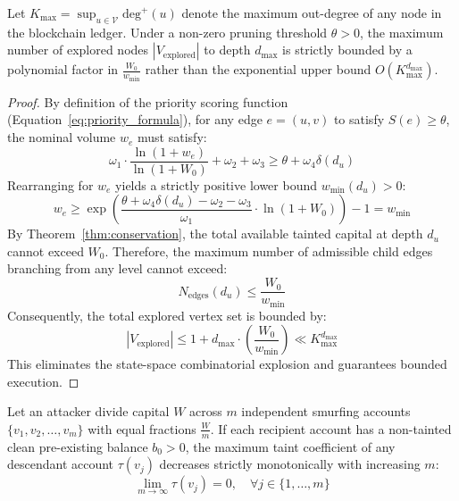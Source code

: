 \begin{theorem}
\label{thm:bounded_traversal}
Let $K_{\max} = \sup_{u \in \mathcal{V}} \text{deg}^+(u)$ denote the maximum out-degree of any node in the blockchain ledger. Under a non-zero pruning threshold $\theta > 0$, the maximum number of explored nodes $|V_{\text{explored}}|$ to depth $d_{\max}$ is strictly bounded by a polynomial factor in $\frac{W_0}{w_{\min}}$ rather than the exponential upper bound $O(K_{\max}^{d_{\max}})$.
\end{theorem}

\begin{proof}
By definition of the priority scoring function (Equation~\ref{eq:priority_formula}), for any edge $e = (u, v)$ to satisfy $S(e) \ge \theta$, the nominal volume $w_e$ must satisfy:
\begin{equation}
    \omega_1 \cdot \frac{\ln(1 + w_e)}{\ln(1 + W_0)} + \omega_2 + \omega_3 \ge \theta + \omega_4 \delta(d_u)
\end{equation}
Rearranging for $w_e$ yields a strictly positive lower bound $w_{\min}(d_u) > 0$:
\begin{equation}
    w_e \ge \exp\left( \frac{\theta + \omega_4 \delta(d_u) - \omega_2 - \omega_3}{\omega_1} \cdot \ln(1 + W_0) \right) - 1 = w_{\min}
\end{equation}
By Theorem~\ref{thm:conservation}, the total available tainted capital at depth $d_u$ cannot exceed $W_0$. Therefore, the maximum number of admissible child edges branching from any level cannot exceed:
\begin{equation}
    N_{\text{edges}}(d_u) \le \frac{W_0}{w_{\min}}
\end{equation}
Consequently, the total explored vertex set is bounded by:
\begin{equation}
    |V_{\text{explored}}| \le 1 + d_{\max} \cdot \left(\frac{W_0}{w_{\min}}\right) \ll K_{\max}^{d_{\max}}
\end{equation}
This eliminates the state-space combinatorial explosion and guarantees bounded execution.
\end{proof}

\begin{theorem}
\label{thm:dissipation}
Let an attacker divide capital $W$ across $m$ independent smurfing accounts $\{v_1, v_2, \dots, v_m\}$ with equal fractions $\frac{W}{m}$. If each recipient account has a non-tainted clean pre-existing balance $b_0 > 0$, the maximum taint coefficient of any descendant account $\tau(v_j)$ decreases strictly monotonically with increasing $m$:
\begin{equation}
    \lim_{m \to \infty} \tau(v_j) = 0, \quad \forall j \in \{1, \dots, m\}
\end{equation}
\end{theorem}

